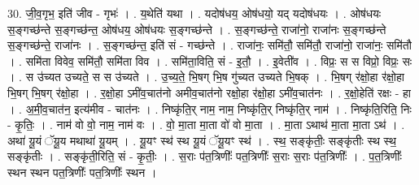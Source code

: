 \documentclass[17pt]{extarticle}
\begin{document}
30. जी॒व॒गृभ॒ इति॑ जीव - गृभः॑ । . य॒थेति॑ यथा । . यदोष॑धय॒ ओष॑धयो॒ यद् यदोष॑धयः । . ओष॑धयः स॒ङ्गच्छ॑न्ते स॒ङ्गच्छ॑न्त॒ ओष॑धय॒ ओष॑धयः स॒ङ्गच्छ॑न्ते । . स॒ङ्गच्छ॑न्ते॒ राजा॑नो॒ राजा॑नः स॒ङ्गच्छ॑न्ते स॒ङ्गच्छ॑न्ते॒ राजा॑नः । . स॒ङ्गच्छ॑न्त॒ इति॑ सं - गच्छ॑न्ते । . राजा॑नः॒ समि॑तौ॒ समि॑तौ॒ राजा॑नो॒ राजा॑नः॒ समि॑तौ । . समि॑ता विवेव॒ समि॑तौ॒ समि॑ता विव । . समि॑ता॒विति॒ सं - इ॒तौ॒ । . इ॒वेती॑व । . विप्रः॒ स स विप्रो॒ विप्रः॒ सः । . स उ॑च्यत उच्यते॒ स स उ॑च्यते । . उ॒च्य॒ते॒ भि॒षग् भि॒ष गु॑च्यत उच्यते भि॒षक् । . भि॒षग् र॑क्षो॒हा र॑क्षो॒हा भि॒षग् भि॒षग् र॑क्षो॒हा । . र॒क्षो॒हा ऽमी॑व॒चात॑नो अमीव॒चात॑नो रक्षो॒हा र॑क्षो॒हा ऽमी॑व॒चात॑नः । . र॒क्षो॒हेति॑ रक्षः - हा । . अ॒मी॒व॒चात॑न॒ इत्य॑मीव - चात॑नः । . निष्कृ॑ति॒र् नाम॒ नाम॒ निष्कृ॑ति॒र् निष्कृ॑ति॒र् नाम॑ । . निष्कृ॑ति॒रिति॒ निः - कृ॒तिः॒ । . नाम॑ वो वो॒ नाम॒ नाम॑ वः । . वो॒ मा॒ता मा॒ता वो॑ वो मा॒ता । . मा॒ता ऽथाथ॑ मा॒ता मा॒ता ऽथ॑ । . अथा॑ यू॒यं ॅयू॒य मथाथा॑ यू॒यम् । . यू॒यꣳ स्थ॑ स्थ यू॒यं ॅयू॒यꣳ स्थ॑ । . स्थ॒ सङ्कृ॑तीः॒ सङ्कृ॑तीः स्थ स्थ॒ सङ्कृ॑तीः । . सङ्कृ॑ती॒रिति॒ सं - कृ॒तीः॒ । . स॒राः प॑त॒त्रिणीः᳚ पत॒त्रिणीः᳚ स॒राः स॒राः प॑त॒त्रिणीः᳚ । . प॒त॒त्रिणीः᳚ स्थन स्थन पत॒त्रिणीः᳚ पत॒त्रिणीः᳚ स्थन । \newline
\end{document}
